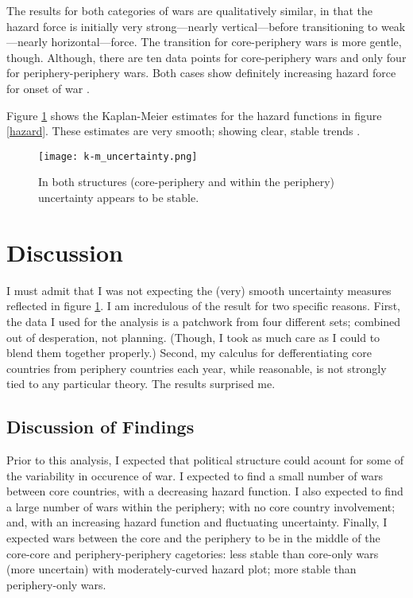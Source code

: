 \documentclass[pdftex,12pt]{article}
\begin{document}
The results for both categories of wars are qualitatively similar, in that the hazard force is initially very strong---nearly vertical---before transitioning to weak---nearly horizontal---force. 
The transition for core-periphery wars is more gentle, though. 
Although, there are ten data points for core-periphery wars and only four for periphery-periphery wars. 
Both cases show definitely increasing hazard force for onset of war \parencite[62]{Cioffi-Revilla1998}. 

Figure \ref{uncert} shows the Kaplan-Meier estimates for the hazard functions in figure \ref{hazard}.
These estimates are very smooth; showing clear, stable trends \parencite[122]{Cioffi-Revilla1998}. 


\begin{figure}[h!]
\centering
\texttt{[image: k-m\_uncertainty.png]}
\caption[ ]{In both structures (core-periphery and within the periphery) uncertainty appears to be stable.} 
\label{uncert}
\end{figure}


\section{Discussion}
%
I must admit that I was not expecting the (very) smooth uncertainty measures reflected in figure \ref{uncert}. 
I am incredulous of the result for two specific reasons.
First, the data I used for the analysis is a patchwork from four different sets; combined out of desperation, not planning. 
(Though, I took as much care as I could to blend them together properly.)
Second, my calculus for defferentiating core countries from periphery countries each year, while reasonable, is not strongly tied to any particular theory.
The results surprised me. 

\subsection{Discussion of Findings}
Prior to this analysis, I expected that political structure could acount for some of the variability in occurence of war. 
I expected to find a small number of wars between core countries, with a decreasing hazard function. 
I also expected to find a large number of wars within the periphery; with no core country involvement; and, with an increasing hazard function and fluctuating uncertainty.
Finally, I expected wars between the core and the periphery to be in the middle of the core-core and periphery-periphery cagetories: less stable than core-only wars (more uncertain) with moderately-curved hazard plot; more stable than periphery-only wars.
\end{document}
